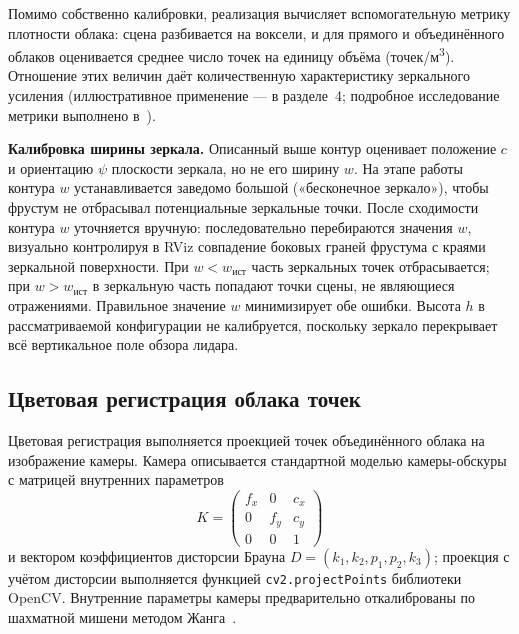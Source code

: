 \documentclass{misisarticle}
\begin{document}
Помимо собственно калибровки, реализация вычисляет вспомогательную
метрику плотности облака: сцена разбивается на воксели, и для прямого и
объединённого облаков оценивается среднее число точек на единицу
объёма (точек/м\textsuperscript{3}). Отношение этих величин даёт
количественную характеристику зеркального усиления (иллюстративное
применение --- в разделе~4; подробное исследование метрики выполнено
в~\cite{VisFed26}).

\textbf{Калибровка ширины зеркала.} Описанный выше контур оценивает
положение $c$ и ориентацию $\psi$ плоскости зеркала, но не его ширину
$w$. На этапе работы контура $w$ устанавливается заведомо большой
(«бесконечное зеркало»), чтобы фрустум не отбрасывал потенциальные
зеркальные точки. После сходимости контура $w$ уточняется вручную:
последовательно перебираются значения $w$, визуально контролируя
в RViz совпадение боковых граней фрустума с краями зеркальной
поверхности. При $w < w_{\text{ист}}$ часть зеркальных точек
отбрасывается; при $w > w_{\text{ист}}$ в зеркальную часть попадают
точки сцены, не являющиеся отражениями. Правильное значение $w$
минимизирует обе ошибки. Высота $h$ в рассматриваемой конфигурации не
калибруется, поскольку зеркало перекрывает всё вертикальное поле
обзора лидара.

\subsection{Цветовая регистрация облака точек}
\label{sec:color}

Цветовая регистрация выполняется проекцией точек объединённого облака
на изображение камеры. Камера описывается стандартной моделью
камеры-обскуры с матрицей внутренних параметров
\begin{equation}
  K = \begin{pmatrix}
    f_x & 0   & c_x \\
    0   & f_y & c_y \\
    0   & 0   & 1
  \end{pmatrix}
\end{equation}
и вектором коэффициентов дисторсии Брауна
$D = (k_1, k_2, p_1, p_2, k_3)$; проекция с учётом дисторсии
выполняется функцией \texttt{cv2.projectPoints} библиотеки OpenCV.
Внутренние параметры камеры предварительно откалиброваны по
шахматной мишени методом Жанга~\cite{Zhang2000Calibration}.
\end{document}
